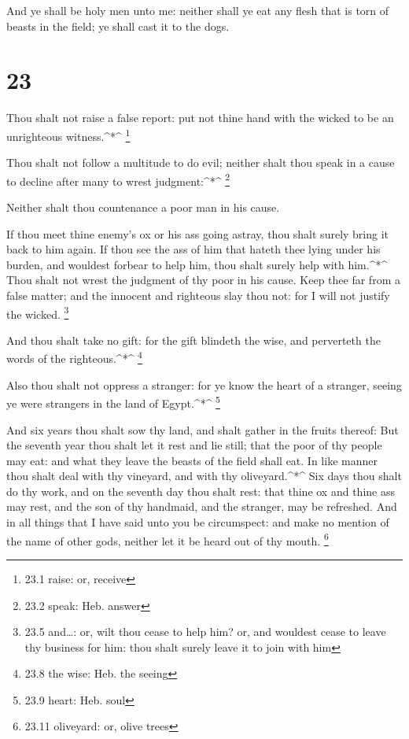  And ye shall be holy men unto me: neither shall ye eat any
flesh that is torn of beasts in the field; ye shall cast it to the dogs.

\hypertarget{section-22}{%
\section{23}\label{section-22}}

 Thou shalt not raise a false report: put not thine hand
with the wicked to be an unrighteous witness.\^{}*\^{} \footnote{23.1
  raise: or, receive}

 Thou shalt not follow a multitude to do evil; neither shalt
thou speak in a cause to decline after many to wrest judgment:\^{}*\^{}
\footnote{23.2 speak: Heb. answer}

 Neither shalt thou countenance a poor man in his cause.

 If thou meet thine enemy's ox or his ass going astray, thou
shalt surely bring it back to him again.  If thou see the
ass of him that hateth thee lying under his burden, and wouldest forbear
to help him, thou shalt surely help with him.\^{}*\^{}  Thou
shalt not wrest the judgment of thy poor in his cause.  Keep
thee far from a false matter; and the innocent and righteous slay thou
not: for I will not justify the wicked. \footnote{23.5 and\ldots: or,
  wilt thou cease to help him? or, and wouldest cease to leave thy
  business for him: thou shalt surely leave it to join with him}

 And thou shalt take no gift: for the gift blindeth the
wise, and perverteth the words of the righteous.\^{}*\^{} \footnote{23.8
  the wise: Heb. the seeing}

 Also thou shalt not oppress a stranger: for ye know the
heart of a stranger, seeing ye were strangers in the land of
Egypt.\^{}*\^{} \footnote{23.9 heart: Heb. soul}

 And six years thou shalt sow thy land, and shalt gather in
the fruits thereof:  But the seventh year thou shalt let it
rest and lie still; that the poor of thy people may eat: and what they
leave the beasts of the field shall eat. In like manner thou shalt deal
with thy vineyard, and with thy oliveyard.\^{}*\^{}  Six
days thou shalt do thy work, and on the seventh day thou shalt rest:
that thine ox and thine ass may rest, and the son of thy handmaid, and
the stranger, may be refreshed.  And in all things that I
have said unto you be circumspect: and make no mention of the name of
other gods, neither let it be heard out of thy mouth. \footnote{23.11
  oliveyard: or, olive trees}

